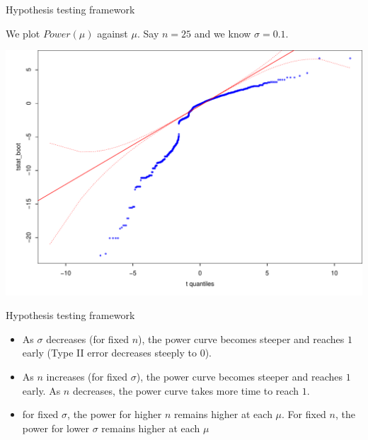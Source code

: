 \documentclass{beamer}\usepackage[]{graphicx}\usepackage[]{color}
\newenvironment{knitrout}{}{} %
\renewenvironment{knitrout}{\begin{spacing}{0.75}\begin{tiny}}{\end{tiny}\end{spacing}}
\begin{document}
\begin{frame}{Hypothesis testing framework}

We plot $Power(\mu)$ against $\mu$.  Say $n=25$ and we know $\sigma=0.1$. \newline

\begin{knitrout}\small
{}\color{fgcolor}

{\centering \includegraphics[width=0.99\linewidth]{figure/graphics-unnamed-chunk-3-1} 

}



\end{knitrout}

\end{frame}

\begin{frame}{Hypothesis testing framework}

\begin{itemize}

\item As $\sigma$ decreases (for fixed $n$), the power curve becomes steeper and reaches $1$ early (Type II error decreases steeply to $0$). \pause \newline

\item As $n$ increases (for fixed $\sigma$), the power curve becomes steeper and reaches $1$ early. As $n$ decreases, the power curve takes more time to reach $1$. \pause \newline

\item for fixed $\sigma$, the power for higher $n$ remains higher at each $\mu$. For fixed $n$, the power for lower $\sigma$ remains higher at each $\mu$

\end{itemize}

\end{frame}
\end{document}
